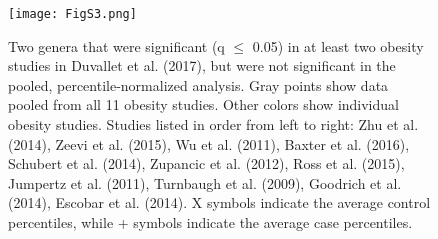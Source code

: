 \begin{figure}[h]
\begin{center}
    \texttt{[image: FigS3.png]}
    \caption{Two genera that were significant (q $\leq$ 0.05) in at least two obesity studies in Duvallet et al. (2017), but were not significant in the pooled, percentile-normalized analysis. Gray points show data pooled from all 11 obesity studies. Other colors show individual obesity studies. Studies listed in order from left to right: Zhu et al. (2014), Zeevi et al. (2015), Wu et al. (2011), Baxter et al. (2016), Schubert et al. (2014), Zupancic et al. (2012), Ross et al. (2015), Jumpertz et al. (2011), Turnbaugh et al. (2009), Goodrich et al. (2014), Escobar et al. (2014). X symbols indicate the average control percentiles, while + symbols indicate the average case percentiles.}\label{percnorm:figS3}
\end{center}
\end{figure}

\begin{singlespace}


\end{singlespace}
